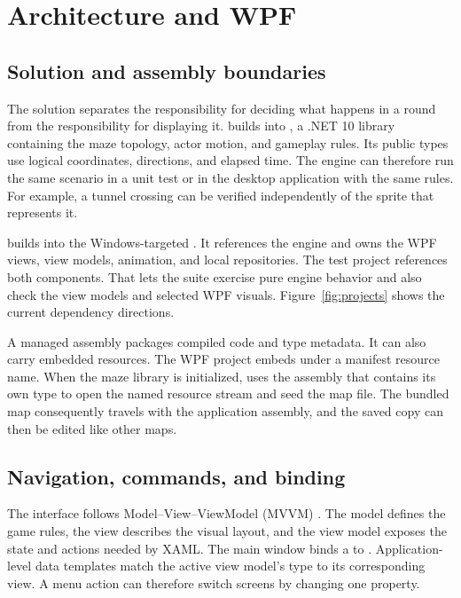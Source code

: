 \clearpage
\section{Architecture and WPF}

\subsection{Solution and assembly boundaries}

The solution separates the responsibility for deciding what happens in a round from the responsibility for displaying it.  builds into , a .NET 10 library containing the maze topology, actor motion, and gameplay rules. Its public types use logical coordinates, directions, and elapsed time. The engine can therefore run the same scenario in a unit test or in the desktop application with the same rules. For example, a tunnel crossing can be verified independently of the sprite that represents it.

 builds into the Windows-targeted . It references the engine and owns the WPF views, view models, animation, and local repositories. The test project references both components. That lets the suite exercise pure engine behavior and also check the view models and selected WPF visuals. Figure~\ref{fig:projects} shows the current dependency directions.

A managed assembly packages compiled code and type metadata. It can also carry embedded resources. The WPF project embeds  under a manifest resource name. When the maze library is initialized,  uses the assembly that contains its own type to open the named resource stream and seed the map file. The bundled map consequently travels with the application assembly, and the saved copy can then be edited like other maps.


\clearpage
\subsection{Navigation, commands, and binding}

The interface follows Model--View--ViewModel (MVVM) \cite{mvvm}. The model defines the game rules, the view describes the visual layout, and the view model exposes the state and actions needed by XAML. The main window binds a  to . Application-level data templates match the active view model's type to its corresponding view. A menu action can therefore switch screens by changing one property.

